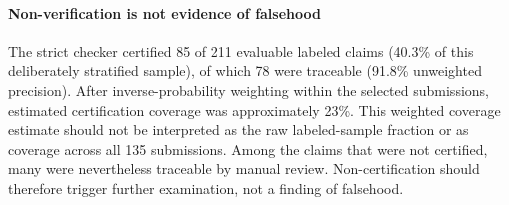 \documentclass[preprint,12pt,authoryear]{elsarticle}
\begin{document}
\begin{table}[t]
\centering
\caption{Comparison with baselines on the 129 labeled real claims not used for tuning (development test split and confirmation sample; 94 traceable). Precision with exact 95\% intervals on unweighted counts. Decoy acceptance on the decoys of the 211 labeled claims; not defined for the LLM verifier, which sees only the top-ranked entries.}
\label{tab:baselines}
\footnotesize
{}
\end{table}

\paragraph{Non-verification is not evidence of falsehood} The strict checker certified 85 of 211 evaluable labeled claims (40.3\% of this deliberately stratified sample), of which 78 were traceable (91.8\% unweighted precision). After inverse-probability weighting within the selected submissions, estimated certification coverage was approximately 23\%. This weighted coverage estimate should not be interpreted as the raw labeled-sample fraction or as coverage across all 135 submissions. Among the claims that were not certified, many were nevertheless traceable by manual review. Non-certification should therefore trigger further examination, not a finding of falsehood.
\end{document}
